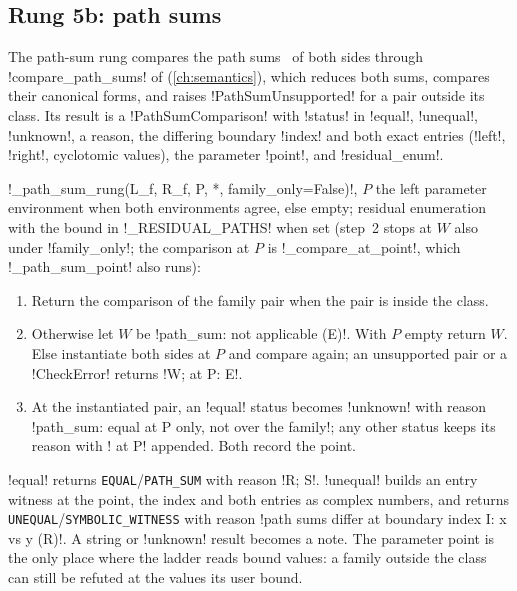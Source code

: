 \subsection{Rung 5b: path sums}\label{sec:proofs-rung-pathsum}

The path-sum rung compares the path sums~\cite{amy2018pathsums} of both sides through \py!compare_path_sums! of  (\cref{ch:semantics}), which reduces both sums, compares their canonical forms, and raises \py!PathSumUnsupported! for a pair outside its class. Its result is a \py!PathSumComparison! with \py!status! in \code!equal!, \code!unequal!, \code!unknown!, a reason, the differing boundary \py!index! and both exact entries (\py!left!, \py!right!, cyclotomic values), the parameter \py!point!, and \py!residual_enum!.

\begin{algorithm}\label{alg:proofs-pathsum}
\py!_path_sum_rung(L_f, R_f, P, *, family_only=False)!, $P$ the left parameter environment when both environments agree, else empty; residual enumeration with the bound in \py!_RESIDUAL_PATHS! when set (step~2 stops at $W$ also under \py!family_only!; the comparison at $P$ is \py!_compare_at_point!, which \py!_path_sum_point! also runs):
\begin{enumerate}
\item Return the comparison of the family pair when the pair is inside the class.
\item Otherwise let $W$ be \code!path_sum: not applicable (E)!. With $P$ empty return $W$. Else instantiate both sides at $P$ and compare again; an unsupported pair or a \py!CheckError! returns \code!W; at {P}: E!.
\item At the instantiated pair, an \code!equal! status becomes \code!unknown! with reason \code!path_sum: equal at {P} only, not over the family!; any other status keeps its reason with \code! at {P}! appended. Both record the point.
\end{enumerate}
\end{algorithm}

\code!equal! returns \texttt{EQUAL}/\allowbreak\texttt{PATH\_SUM} with reason \code!R; S!. \code!unequal! builds an entry witness at the point, the index and both entries as complex numbers, and returns \texttt{UNEQUAL}/\allowbreak\texttt{SYMBOLIC\_WITNESS} with reason \code!path sums differ at boundary index I: x vs y (R)!. A string or \code!unknown! result becomes a note. The parameter point is the only place where the ladder reads bound values: a family outside the class can still be refuted at the values its user bound.

